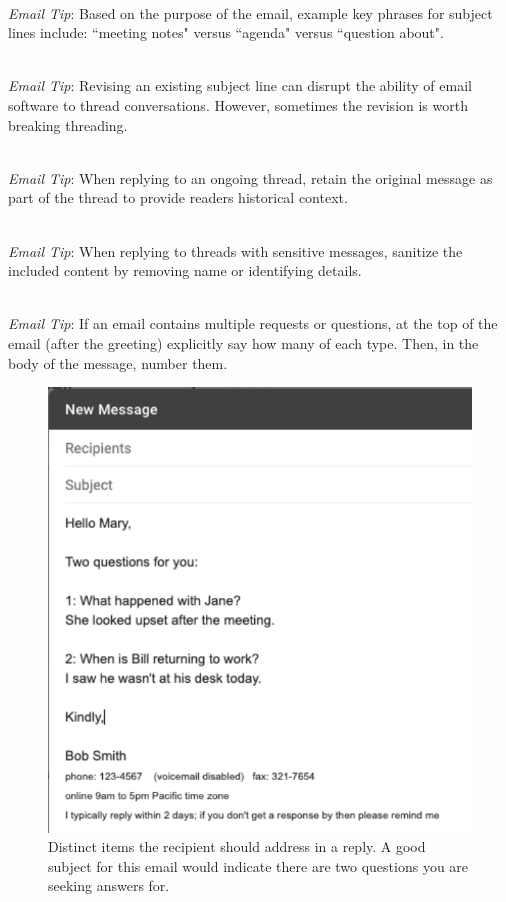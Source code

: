 \ \\
\textit{Email Tip}: Based on the purpose of the email, example key phrases for subject lines include: ``meeting notes" versus ``agenda" versus ``question about".

\ \\
\textit{Email Tip}: Revising an existing subject line can disrupt the ability of email software to thread conversations. However, sometimes the revision is worth breaking threading.

\ \\
\textit{Email Tip}: When replying to an ongoing thread, retain the original message as part of the thread to provide readers historical context.

\ \\
\textit{Email Tip}: When replying to threads with sensitive messages, sanitize the included content by removing name or identifying details.

\ \\
\textit{Email Tip}: If an email contains multiple requests or questions, at the top of the email (after the greeting) explicitly say how many of each type. Then, in the body of the message, number them.

\begin{figure}
\includegraphics[width=1\textwidth]{images/email_two_questions.pdf}
\caption{Distinct items the recipient should address in a reply. A good subject for this email would indicate there are two questions you are seeking answers for.}
\label{fig:email_two_questions}
\end{figure}

